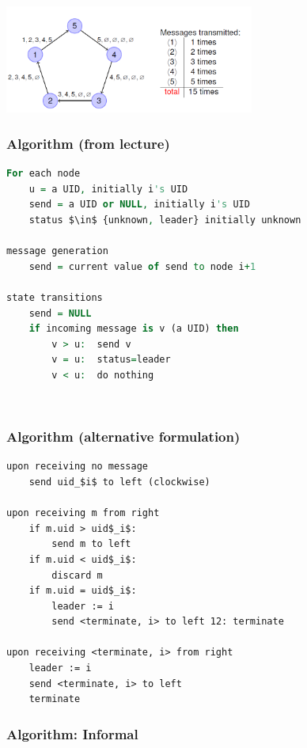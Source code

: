 \begin{minipage}{\linewidth}
	\centering\includegraphics[width=310px]{gfx/lcr.png}
	\label{img:lcr}
\end{minipage}

\subsubsection*{Algorithm (from lecture) }

\begin{lstlisting}[mathescape, language=VHDL, keywordstyle=\ttfamily]
For each node
	u = a UID, initially i's UID
	send = a UID or NULL, initially i's UID
	status $\in$ {unknown, leader} initially unknown

message generation
	send = current value of send to node i+1

state transitions
	send = NULL
	if incoming message is v (a UID) then
		v > u: 	send v
		v = u: 	status=leader
		v < u: 	do nothing
\end{lstlisting}
\ \\

\subsubsection*{Algorithm (alternative formulation)}
\begin{lstlisting}[mathescape]
upon receiving no message
	send uid_$i$ to left (clockwise)

upon receiving m from right
	if m.uid > uid$_i$:
		send m to left
	if m.uid < uid$_i$:
		discard m
	if m.uid = uid$_i$:
		leader := i
		send <terminate, i> to left 12: terminate

upon receiving <terminate, i> from right
	leader := i
	send <terminate, i> to left 
	terminate
\end{lstlisting}

\subsubsection*{Algorithm: Informal}

